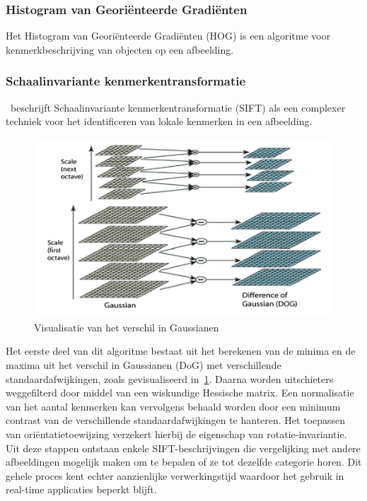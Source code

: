 \subsubsection{Histogram van Georiënteerde Gradiënten}
Het Histogram van Geori\"enteerde Gradi\"enten (HOG) is een algoritme voor kenmerkbeschrijving van objecten op een afbeelding.

\subsubsection{Schaalinvariante kenmerkentransformatie}
\textcite{Tamara2022}~beschrijft Schaalinvariante kenmerkentransformatie (SIFT) als een complexer techniek voor het identificeren van lokale kenmerken in een afbeelding.
\begin{figure}
    \includegraphics[width=1\linewidth]{images/DoG}
    \caption{Visualisatie van het verschil in Gaussianen~\autocite{Lowe2004}}
    \label{fig:difference-of-gaussian}
\end{figure}
Het eerste deel van dit algoritme bestaat uit het berekenen van de minima en de maxima uit het verschil in Gaussianen (DoG) met verschillende standaardafwijkingen, zoals gevisualiseerd in~\ref{fig:difference-of-gaussian}.
Daarna worden uitschieters weggefilterd door middel van een wiskundige Hessische matrix.
Een normalisatie van het aantal kenmerken kan vervolgens behaald worden door een minimum contrast van de verschillende standaardafwijkingen te hanteren.
Het toepassen van ori\"entatietoewijzing verzekert hierbij de eigenschap van rotatie-invariantie.
Uit deze stappen ontstaan enkele SIFT-beschrijvingen die vergelijking met andere afbeeldingen mogelijk maken om te bepalen of ze tot dezelfde categorie horen.
Dit gehele proces kent echter aanzienlijke verwerkingstijd waardoor het gebruik in real-time applicaties beperkt blijft.

